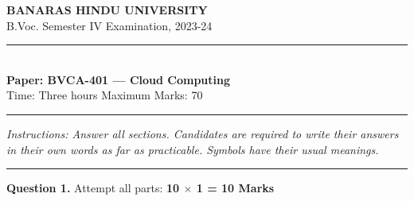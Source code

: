 \documentclass[11pt,a4paper]{article}
\begin{document}
\begin{center}
  {\large\bfseries BANARAS HINDU UNIVERSITY}\\[2pt]
  {
\normalsize B.Voc. Semester IV Examination, 2023-24}\\[6pt]
  \rule{0.8\linewidth}{0.5pt}\\[6pt]
  {\large\bfseries Paper: BVCA-401 --- Cloud Computing}\\[4pt]
  {
\normalsize Time: Three hours \hfill Maximum Marks: 70}
\end{center}

\rule{\linewidth}{0.4pt}

\smallskip



\noindent   \textit{Instructions: Answer all sections. Candidates are required to write their answers in their own words as far as practicable. Symbols have their usual meanings.}

\bigskip




\rule{\linewidth}{0.4pt}\smallskip




\noindent   \textbf{Question 1.} Attempt all parts: \hfill   \textbf{10 $ \times$ 1 = 10 Marks}
\end{document}
